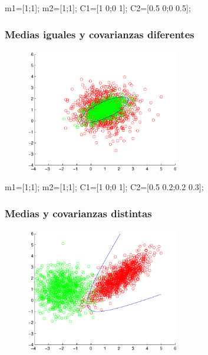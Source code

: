 \documentclass[11pt]{scrartcl}
\begin{document}
\begin{matlabcode}
m1=[1;1]; m2=[1;1]; 
C1=[1 0;0 1]; C2=[0.5 0;0 0.5];  
\end{matlabcode}

\subsubsection{Medias iguales y covarianzas diferentes}

\begin{figure}[h!]
  \centering
  \includegraphics[width=0.6\textwidth]{img/bayes_2d_4}
  \label{Medias iguales y covarianzas proporcionales}
\end{figure}

\begin{matlabcode}
m1=[1;1]; m2=[1;1]; 
C1=[1 0;0 1]; C2=[0.5 0.2;0.2 0.3];  
\end{matlabcode}

\subsubsection{Medias y covarianzas distintas}

\begin{figure}[h!]
  \centering
  \includegraphics[width=0.6\textwidth]{img/bayes_2d_5}
  \label{Medias iguales y covarianzas proporcionales}
\end{figure}
\end{document}
